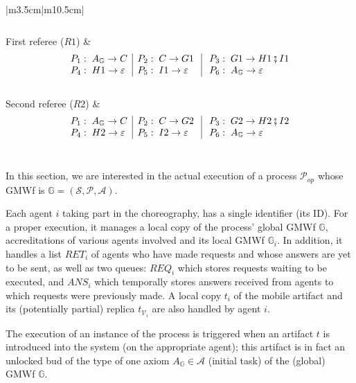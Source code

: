 \begin{table}[h]
\begin{tabular}[t]{|m{3.5cm}|m{10.5cm}|}
\[\begin{array}{l|l|l}
		\end{array}
		\]
		\\
		\hline
		First referee ($R1$) & 
		\[ 
		\begin{array}{l|l|l}
		P_{1}:\; A_{\mathbb{G}}\rightarrow C & P_{2}:\; C\rightarrow G1\; & \; P_{3}:\; G1\rightarrow H1\fatsemi I1 \\
		P_{4}:\; H1\rightarrow \varepsilon & P_{5}:\; I1\rightarrow \varepsilon \; & \; P_{6}:\; A_{\mathbb{G}}\rightarrow \varepsilon \\
		\end{array}
		\]
		\\
		\hline
		Second referee ($R2$) & 
		\[ 
		\begin{array}{l|l|l}
		P_{1}:\; A_{\mathbb{G}}\rightarrow C & P_{2}:\; C\rightarrow G2\; & \; P_{3}:\; G2\rightarrow H2\fatsemi I2 \\
		P_{4}:\; H2\rightarrow \varepsilon & P_{5}:\; I2\rightarrow \varepsilon \; & \; P_{6}:\; A_{\mathbb{G}}\rightarrow \varepsilon \\
		\end{array}
		\]
		\\
		\hline
	\end{tabular}
\end{table}



\label{chap3:sec:execution-model}

In this section, we are interested in the actual execution of a process $\mathcal{P}_{op}$ whose GMWf is $\mathbb{G}=\left(\mathcal{S},\mathcal{P},\mathcal{A}\right)$.

\label{chap3:sec:initial-configuration-of-a-peer}

Each agent $i$ taking part in the choreography, has a single identifier (its ID). For a proper execution, it manages a local copy of the process' global GMWf $\mathbb{G}$, accreditations of various agents involved and its local GMWf $\mathbb{G}_{i}$. In addition, it handles a list $RET_i$ of agents who have made requests and whose answers are yet to be sent, as well as two queues: $REQ_i$ which stores requests waiting to be executed, and $ANS_i$ which temporally stores answers received from agents to which requests were previously made. A local copy $t_i$ of the mobile artifact and its (potentially partial) replica $t_{\mathcal{V}_{i}}$ are also handled by agent $i$.


\label{chap3:sec:architecture-of-a-peer}
The execution of an instance of the process is triggered when an artifact $t$ is introduced into the system (on the appropriate agent); this artifact is in fact an unlocked bud of the type of one axiom $A_\mathbb{G} \in \mathcal{A}$ (initial task) of the (global) GMWf $\mathbb{G}$.

